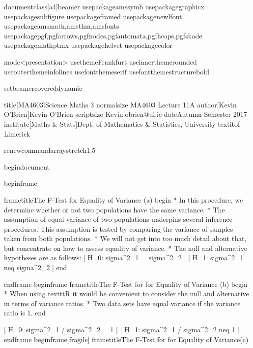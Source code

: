 documentclass[a4]{beamer}
usepackage{amssymb}
usepackage{graphicx}
usepackage{subfigure}
usepackage{framed}
usepackage{newlfont}
usepackage{amsmath,amsthm,amsfonts}
usepackage{pgf,pgfarrows,pgfnodes,pgfautomata,pgfheaps,pgfshade}
usepackage{mathptmx}  %
usepackage{helvet}   %
usepackage{color}

mode<presentation> {
 usetheme{Frankfurt} %
 useinnertheme{rounded}
 useoutertheme{infolines}
 usefonttheme{serif}
usefonttheme{structurebold}
}

setbeamercovered{dynamic}

title[MA4603]{Science Maths 3  {normalsize MA4603 Lecture 11A}}
author[Kevin O'Brien]{Kevin O'Brien  {scriptsize Kevin.obrien@ul.ie}}
date{Autumn Semester 2017}
institute[Maths & Stats]{Dept. of Mathematics & Statistics,  University textit{of} Limerick}

renewcommand{arraystretch}{1.5}

begin{document}


begin{frame}

frametitle{The F-Test for Equality of Variance (a)}
begin{ }
         * In this procedure, we determine whether or not two populations have the same variance.
         * The assumption of equal variance of two populations underpins several inference procedures. This assumption is tested by comparing the variance of samples taken from both populations.
         * We will not get into too much detail about that, but concentrate on how to assess equality of variance.
         * The null and alternative hypotheses are as follows:
[ H_0: sigma^2_1 = sigma^2_2 ]
[ H_1: sigma^2_1 neq sigma^2_2 ]
end{ }

end{frame}
begin{frame}
frametitle{The F-Test for for Equality of Variance (b)}
begin{ }
         * When using texttt{R} it would be convenient to consider the null and alternative in terms of variance ratios.
         * Two data sets have equal variance if the variance ratio is 1.
end{ }

[ H_0: sigma^2_1 / sigma^2_2 = 1 ]
[ H_1: sigma^2_1 / sigma^2_2 neq 1 ]
end{frame}
begin{frame}[fragile]
frametitle{The F-Test for for Equality of Variance(c)}

